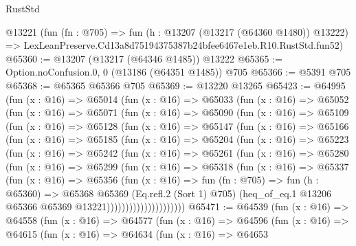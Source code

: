 \begin{lexlean}{RustStd}
\begin{coremodule}
    @13221
    (fun (fn : @705) =>
    fun (h : @13207 (@13217 (@64360 @1480)) @13222) =>
    LexLeanPreserve.Cd13a8d75194375387b24bfee6467e1eb.R10.RustStd.fun52)
@65360 := @13207 (@13217 (@64346 @1485)) @13222
@65365 := Option.noConfusion.{0, 0} (@13186 (@64351 @1485)) @705
@65366 := @5391 @705
@65368 := @65365 @65366 @705
@65369 := @13220 @13265
@65423 := @64995
    (fun (x : @16) =>
    @65014
      (fun (x : @16) =>
      @65033
        (fun (x : @16) =>
        @65052
          (fun (x : @16) =>
          @65071
            (fun (x : @16) =>
            @65090
              (fun (x : @16) =>
              @65109
                (fun (x : @16) =>
                @65128
                  (fun (x : @16) =>
                  @65147
                    (fun (x : @16) =>
                    @65166
                      (fun (x : @16) =>
                      @65185
                        (fun (x : @16) =>
                        @65204
                          (fun (x : @16) =>
                          @65223
                            (fun (x : @16) =>
                            @65242
                              (fun (x : @16) =>
                              @65261
                                (fun (x : @16) =>
                                @65280
                                  (fun (x : @16) =>
                                  @65299
                                    (fun (x : @16) =>
                                    @65318
                                      (fun (x : @16) =>
                                      @65337
                                        (fun (x : @16) =>
                                        @65356
                                          (fun (x : @16) =>
                                          fun (fn : @705) =>
                                          fun (h : @65360) =>
                                          @65368
                                            @65369
                                            (Eq.refl.{2} (Sort 1) @705)
                                            (heq_of_eq.{1}
                                              @13206
                                              @65366
                                              @65369
                                              @13221)))))))))))))))))))))
@65471 := @64539
    (fun (x : @16) =>
    @64558
      (fun (x : @16) =>
      @64577
        (fun (x : @16) =>
        @64596
          (fun (x : @16) =>
          @64615
            (fun (x : @16) =>
            @64634
              (fun (x : @16) =>
              @64653

\end{coremodule}
\end{lexlean}
